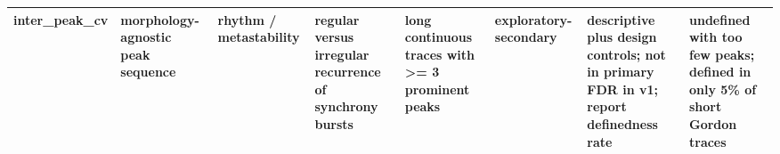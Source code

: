 \begin{longtable}{p{}p{}p{}p{}p{}p{}p{}p{}}
inter\_peak\_cv & morphology-agnostic peak sequence & rhythm / metastability & regular versus irregular recurrence of synchrony bursts & long continuous traces with >= 3 prominent peaks & exploratory-secondary & descriptive plus design controls; not in primary FDR in v1; report definedness rate & undefined with too few peaks; defined in only 5\% of short Gordon traces \\
\bottomrule
\end{longtable}
